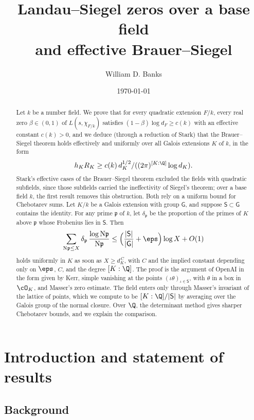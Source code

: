 \documentclass[11pt, reqno, twoside, letterpaper]{amsart}
\title[Landau--Siegel zeros and effective Brauer--Siegel]
{Landau--Siegel zeros over a base field\\ and effective
Brauer--Siegel}
\author{William D. Banks}
\date{\today}
\newcommand{\Nm}{\mathrm{N}}
\newcommand{\fp}{\mathfrak{p}}
\newcommand{\expC}{C}
\newcommand{\XX}{X}
\newcommand{\galKk}{\mathsf{G}}
\newcommand{\Kf}{K}
\newcommand{\wt}{\delta}
\newcommand{\Sset}{\mathsf{S}}
\newcommand{\emb}{\iota}
\begin{document}
\begin{abstract}
Let $k$ be a number field. We prove that for every quadratic
extension $F/k$, every real zero $\beta\in(0,1)$ of $L(s,\chi_{F/k})$
satisfies $(1-\beta)\log d_F\ge c(k)$ with an effective constant
$c(k)>0$, and we deduce (through a reduction of Stark) that the
Brauer--Siegel theorem holds effectively and uniformly over all
Galois extensions $\Kf$ of $k$, in the form
\[
h_\Kf R_\Kf\ge c(k)\,d_\Kf^{1/2}/((2\pi)^{[\Kf:\Q]}\log d_\Kf).
\]
Stark's effective cases of the Brauer--Siegel theorem excluded the
fields with quadratic subfields, since those subfields carried the
ineffectivity of Siegel's theorem; over a base field $k$, the first
result removes this obstruction. Both rely on a uniform bound for
Chebotarev sums. Let $\Kf/k$ be a Galois extension with group
$\galKk$, and suppose $\Sset\subset\galKk$ contains the identity. For
any prime $\fp$ of $k$, let $\wt_\fp$ be the proportion of the primes
of $\Kf$ above $\fp$ whose Frobenius lies in $\Sset$. Then
\[
\sum_{\Nm\fp\le\XX}\wt_\fp\,\frac{\log\Nm\fp}{\Nm\fp}
\le\Big(\frac{|\Sset|}{|\galKk|}+\eps\Big)\log\XX+O(1)
\]
holds uniformly in $\Kf$ as soon as $\XX\ge d_\Kf^{\,\expC}$, with
$\expC$ and the implied constant depending only on $\eps$, $\expC$,
and the degree $[\Kf:\Q]$. The proof is the argument of OpenAI in
the form given by Kerr, simple vanishing at the points
$(\emb\theta)_{\emb\in\Sset}$, with $\theta$ in a box in $\cO_\Kf$,
and Masser's zero estimate. The field enters only through Masser's
invariant of the lattice of points, which we compute to be
$[\Kf:\Q]/|\Sset|$ by averaging over the Galois group of the normal
closure. Over $\Q$, the determinant method gives sharper Chebotarev
bounds, and we explain the comparison.
\end{abstract}

\maketitle

\setcounter{tocdepth}{1}
\tableofcontents

\section{Introduction and statement of results}
\label{sec:intro}

\subsection{Background}
\end{document}
